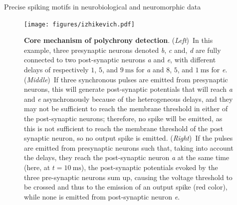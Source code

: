 \documentclass[final]{beamer}
\newcommand{\ms}{\si{\milli\second}}%
\newlength{\colwidth}
\begin{document}
\begin{frame}[t]
\begin{columns}[t]
\begin{column}{\colwidth}
\begin{block}{Precise spiking motifs in neurobiological and neuromorphic data~\parencite{Grimaldi22polychronies}}
    \begin{figure}[H]%
        \texttt{[image: figures/izhikevich.pdf]}%
          \caption{\textbf{Core mechanism of polychrony detection}. {(\textit{Left})}~In this example, three presynaptic neurons denoted \textit{b}, \textit{c} and, \textit{d} are fully connected to two post-synaptic neurons \textit{a} and \textit{e}, with different delays of respectively $1$, $5$, and $9~\ms$ for \textit{a} and  $8$, $5$, and $1~\ms$ for \textit{e}. {(\textit{Middle})}~If three synchronous pulses are emitted from presynaptic neurons, this will generate post-synaptic potentials that will reach \textit{a} and \textit{e} asynchronously because of the heterogeneous delays, and they may not be sufficient to reach the membrane threshold in either of the post-synaptic neurons; therefore, no spike will be emitted, as this is not sufficient to reach the membrane threshold of the post synaptic neuron, so no output spike is emitted.
          {(\textit{Right})}~If the pulses are emitted from presynaptic neurons such that, taking into account the delays, they reach the post-synaptic neuron \textit{a} at the same time (here, at $t=10~\ms$),  the post-synaptic potentials evoked by the three pre-synaptic neurons sum up, causing the voltage threshold to be crossed and thus to the emission of an output spike (red color), while none is emitted from post-synaptic neuron \textit{e}.
           }
        \label{fig:izhikevich}
      \end{figure}
%

  \end{block}


\end{column}
\end{columns}
\end{frame}
\end{document}
